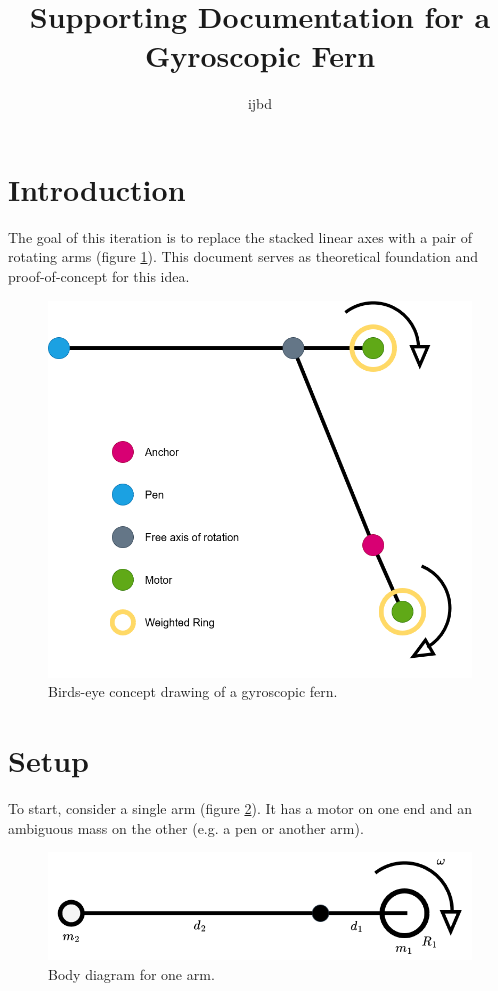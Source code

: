 \documentclass{article}
\title{Supporting Documentation for a Gyroscopic Fern}
\author{ijbd}
\begin{document}
	\section{Introduction}

	The goal of this iteration is to replace the stacked linear axes with a pair of rotating arms (figure \ref{fig:high-level-concept}). 
	This document serves as theoretical foundation and proof-of-concept for this idea.
	
	\begin{figure}[h!]
   		\includegraphics[width=\linewidth]{../diagrams/fern-v3-concept-diagram.png}   
		\caption{Birds-eye concept drawing of a gyroscopic fern.}
		\label{fig:high-level-concept}
	\end{figure}

	\section{Setup}

	To start, consider a single arm (figure \ref{fig:high-level-one-arm}). It has a motor on one end and an ambiguous mass on the other
	(e.g. a pen or another arm). 

	\begin{figure}[h!]
		\includegraphics[width=\linewidth]{../diagrams/fern-v3-single-arm-diagram.png}   
	 	\caption{Body diagram for one arm.}
	 	\label{fig:high-level-one-arm}
 	\end{figure}
\end{document}
